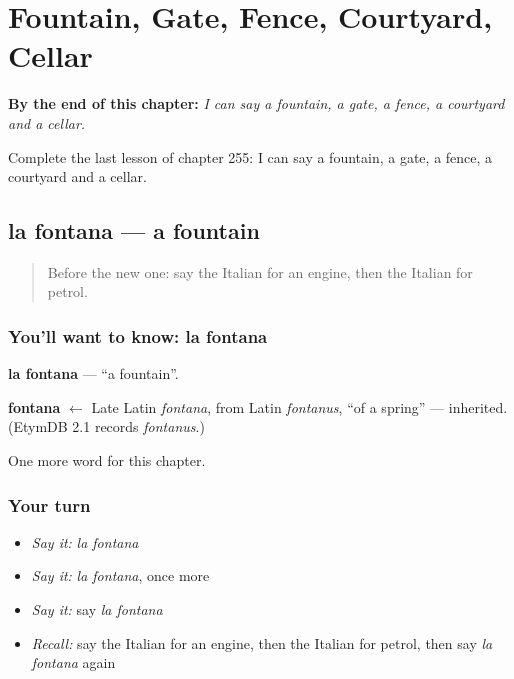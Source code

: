 
\chapter{Fountain, Gate, Fence, Courtyard, Cellar}
\label{ch:it-fountain-gate-fence-courtyard-cellar}

\begin{chapteropening}
\textbf{By the end of this chapter:} \emph{I can say a fountain, a gate, a fence, a courtyard and a cellar.}

Complete the last lesson of chapter 255: I can say a fountain, a gate, a fence, a courtyard and a cellar.
\end{chapteropening}

\section[la fontana]{la fontana — a fountain}

\label{lesson:IT-C255-fontana}



\begin{quote}
Before the new one: say the Italian for an engine, then the Italian for petrol.
\end{quote}

\subsection*{You'll want to know: la fontana}
\textbf{la fontana} — \textquotedblleft{}a fountain\textquotedblright{}.

\begin{cousinweb}
\textbf{fontana} $\leftarrow$ Late Latin \emph{fontana}, from Latin \emph{fontanus}, \textquotedblleft{}of a spring\textquotedblright{} — inherited. (EtymDB 2.1 records \emph{fontanus}.)
\end{cousinweb}

\begin{grammarlens}[title={What you've built}]
One more word for this chapter.
\end{grammarlens}

\subsection*{Your turn}
\begin{itemize}
\raggedright
  \item \emph{Say it:} \emph{la fontana}
  \item \emph{Say it:} \emph{la fontana}, once more
  \item \emph{Say it:} say \emph{la fontana}
  \item \emph{Recall:} say the Italian for an engine, then the Italian for petrol, then say \emph{la fontana} again
\end{itemize}

